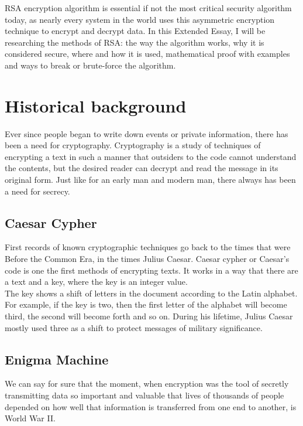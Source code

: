 \documentclass[a4paper, 12pt]{article}
\begin{document}
RSA encryption algorithm is essential if not the most critical security algorithm today, as nearly
every system in the world uses this asymmetric encryption technique to encrypt and decrypt data.
In this Extended Essay, I will be researching the methods of RSA: the way the algorithm works,
why it is considered secure, where and how it is used, mathematical proof with examples and ways
to break or brute-force the algorithm.\\

\section{Historical background}
\label{bsec:historical_background}

Ever since people began to write down events or private information, there has been a need for
cryptography. Cryptography is a study of techniques of encrypting a text in such a manner that
outsiders to the code cannot understand the contents, but the desired reader can decrypt and read
the message in its original form. Just like for an early man and modern man, there always has been a
need for secrecy.\\

\subsection{Caesar Cypher}
\label{bsec:caesar_cypher}

First records of known cryptographic techniques go back to the times that were Before the
Common Era, in the times Julius Caesar. Caesar cypher or Caesar's code is one the first methods
of encrypting texts. It works in a way that there are a text and a key, where the key is an integer value.\\

The key shows a shift of letters in the document according to the Latin alphabet. For example, if
the key is two, then the first letter of the alphabet will become third, the second will become forth
and so on. During his lifetime, Julius Caesar mostly used three as a shift to protect messages of
military significance.\cite{singh}\\

\subsection{Enigma Machine}
\label{bsec:enigma_machine}

We can say for sure that the moment, when encryption was the tool of secretly transmitting data
so important and valuable that lives of thousands of people depended on how well that information
is transferred from one end to another, is World War II.\\
\end{document}
